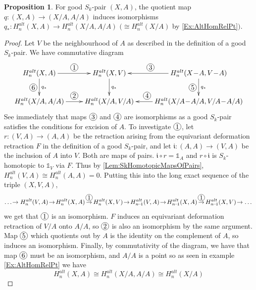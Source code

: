 \documentclass[11pt,a4paper,twoside]{article}
\theoremstyle{plain}
\theoremstyle{definition}
\theoremstyle{definition}
\newtheorem{prop}[thm]{Proposition}
\theoremstyle{definition}
\theoremstyle{definition}
\theoremstyle{definition}
\newcommand*\circled[1]{\tikz[baseline=(char.base)]{
            \node[shape=circle,draw,inner sep=1pt] (char) {#1};}}
\begin{document}
\begin{prop}\label{Prop:GoodSkPairRelativeCongQuotient}
For good $S_k$-pair $(X,A)$, the quotient map $q\!:\!(X,A)\!\longrightarrow\!(X/A,A/A)$ induces isomorphisms $q_*\!:\!H_n^{alt}(X,A)\longrightarrow H_n^{alt}(X/A,A/A)\,\,(\cong H_n^{alt}(X/A)$ by \ref{Ex:AltHomRelPt}$)$.
\end{prop}
\begin{proof}
Let $V$ be the neighbourhood of $A$ as described in the definition of a good $S_k$-pair. We have commutative diagram
\begin{displaymath}
\xymatrix{
    H_n^{alt}(X,A) \ar[r]^{\circled{1}} \ar[d]_{\circled{6}}^{q_*} & H_n^{alt}(X,V) \ar[d]^{q_*} & \ar[l]_{\circled{3}\quad} H_n^{alt}(X\!-\! A,V\!-\! A) \ar[d]_{\circled{5}}^{q_*} \\
    H_n^{alt}(X/A,A/A) \ar[r]^{\circled{2}} & H_n^{alt}(X/A,V/A) & \ar[l]_{\circled{4}\quad\quad} H_n^{alt}(X/A\!-\!A/A,V/A\!-\!A/A)  }
\end{displaymath}
See immediately that maps $\circled{3}$ and $\circled{4}$ are isomorphisms as a good $S_k$-pair satisfies the conditions for excision of $A$. To investigate $\circled{1}$, let $r\!:\!(V,A)\!\longrightarrow\!(A,A)$ be the retraction arising from the equivariant deformation retraction $F$ in the definition of a good $S_k$-pair, and let $\mathfrak{i}\!:\!(A,A)\!\longrightarrow\!(V,A)$ be the inclusion of $A$ into $V$. Both are maps of pairs. $\mathfrak{i}\!\circ\!r=\mathbb{1}_A$ and $r\!\circ\!\mathfrak{i}$ is $S_k$-homotopic to $\mathbb{1}_{V}$ via $F$. Thus by \ref{Lem:SkHomotopicMapsOfPairs}, $H_n^{alt}(V,A)\cong H_n^{alt}(A,A)=0$. Putting this into the long exact sequence of the triple $(X,V,A)$,
$$\dots\!\rightarrow H_n^{alt}(V,A)\!\rightarrow\!H_n^{alt}(X,A)\!\overset{\circled{1}}\rightarrow\!H_n^{alt}(X,V)\!\rightarrow\!H_{n\!-\!1}^{alt}(V,A)\!\rightarrow\!H_{n\!-\!1}^{alt}(X,A)\!\overset{\circled{1}}\rightarrow\!H_{n\!-\!1}^{alt}(X,V)\!\rightarrow\dots$$
we get that $\circled{1}$ is an isomorphism. $F$ induces an equivariant deformation retraction of $V/A$ onto $A/A$, so $\circled{2}$ is also an isomorphism by the same argument. Map $\circled{5}$ which quotients out by $A$ is the identity on the complement of $A$, so induces an isomorphism. Finally, by commutativity of the diagram, we have that map $\circled{6}$ must be an isomorphism, and $A/A$ is a point so as seen in example \ref{Ex:AltHomRelPt} we have
$$H_n^{alt}(X,A)\cong H_n^{alt}(X/A,A/A)\cong H_n^{alt}(X/A)$$
\end{proof}
\end{document}
